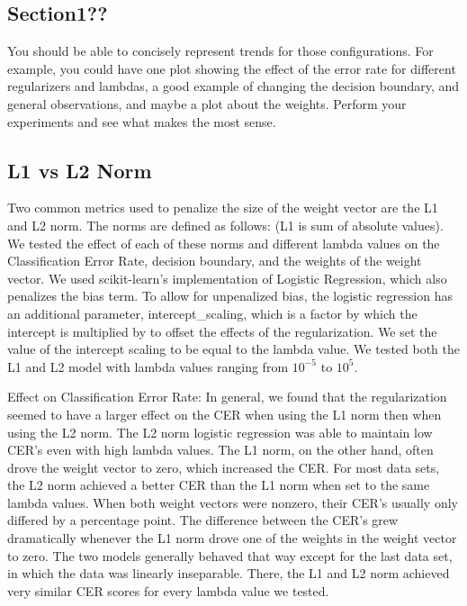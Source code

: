 \documentclass[10pt,twoside]{article}
\begin{document}
\subsection{Section1??}


You should be able to concisely represent trends for those configurations. For example, you could have one plot showing the effect of the error rate for different regularizers and lambdas, a good example of changing the decision boundary, and general observations, and maybe a plot about the weights. Perform your experiments and see what makes the most sense.

\subsection{L1 vs L2 Norm}

Two common metrics used to penalize the size of the weight vector are the L1 and L2 norm. The norms are defined as follows: (L1 is sum of absolute values). We tested the effect of each of these norms and different lambda values on the Classification Error Rate, decision boundary, and the weights of the weight vector. We used scikit-learn's implementation of Logistic Regression, which also penalizes the bias term. To allow for unpenalized bias, the logistic regression has an additional parameter, intercept_scaling, which is a factor by which the intercept is multiplied by to offset the effects of the regularization. We set the value of the intercept scaling to be equal to the lambda value. We tested both the L1 and L2 model with lambda values ranging from $10^{-5}$ to $10^5$. 

Effect on Classification Error Rate:
In general, we found that the regularization seemed to have a larger effect on the CER when using the L1 norm then when using the L2 norm. The L2 norm logistic regression was able to maintain low CER's even with high lambda values. The L1 norm, on the other hand, often drove the weight vector to zero, which increased the CER. For most data sets, the L2 norm achieved a better CER than the L1 norm when set to the same lambda values. When both weight vectors were nonzero, their CER's usually only differed by a percentage point. The difference between the CER's grew dramatically whenever the L1 norm drove one of the weights in the weight vector to zero. The two models generally behaved that way except for the last data set, in which the data was linearly inseparable. There, the L1 and L2 norm achieved very similar CER scores for every lambda value we tested. 
\end{document}
